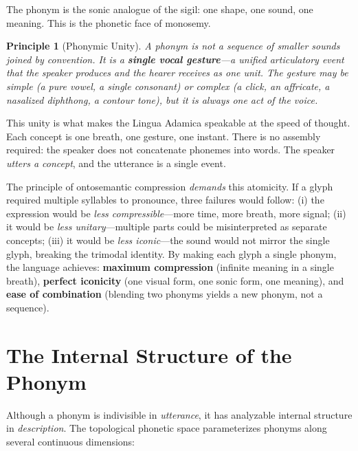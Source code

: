 \documentclass[12pt, letterpaper]{book}
\newtheorem{principle}{Principle}[chapter]
\begin{document}
The phonym is the sonic analogue of the sigil: one shape, one sound, one meaning. This is the phonetic face of monosemy.

\begin{principle}[Phonymic Unity]
A phonym is not a sequence of smaller sounds joined by convention. It is a \textbf{single vocal gesture}---a unified articulatory event that the speaker produces and the hearer receives as one unit. The gesture may be simple (a pure vowel, a single consonant) or complex (a click, an affricate, a nasalized diphthong, a contour tone), but it is always \textit{one act of the voice}.
\end{principle}

This unity is what makes the Lingua Adamica speakable at the speed of thought. Each concept is one breath, one gesture, one instant. There is no assembly required: the speaker does not concatenate phonemes into words. The speaker \textit{utters a concept}, and the utterance is a single event.

The principle of ontosemantic compression \textit{demands} this atomicity. If a glyph required multiple syllables to pronounce, three failures would follow: (i) the expression would be \textit{less compressible}---more time, more breath, more signal; (ii) it would be \textit{less unitary}---multiple parts could be misinterpreted as separate concepts; (iii) it would be \textit{less iconic}---the sound would not mirror the single glyph, breaking the trimodal identity. By making each glyph a single phonym, the language achieves: \textbf{maximum compression} (infinite meaning in a single breath), \textbf{perfect iconicity} (one visual form, one sonic form, one meaning), and \textbf{ease of combination} (blending two phonyms yields a new phonym, not a sequence).


\section{The Internal Structure of the Phonym}

Although a phonym is indivisible in \textit{utterance}, it has analyzable internal structure in \textit{description}. The topological phonetic space parameterizes phonyms along several continuous dimensions:
\end{document}
